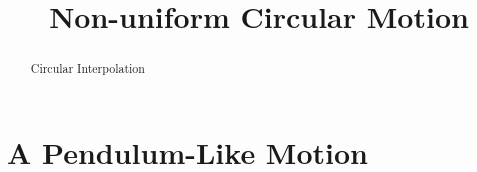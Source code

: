 \documentclass{ximera}
\title{Non-uniform Circular Motion}
\begin{document}
\begin{abstract}
Circular Interpolation
\end{abstract}
\maketitle


\section{A Pendulum-Like Motion}
\end{document}
